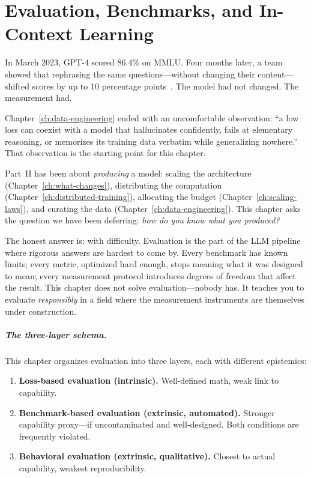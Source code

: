 \chapter{Evaluation, Benchmarks, and In-Context Learning}
\label{ch:evaluation}
\raggedbottom

In March 2023, GPT-4 scored 86.4\% on MMLU. Four months later, a team showed that rephrasing the same questions---without changing their content---shifted scores by up to 10 percentage points~\cite{sclar2023quantifying}. The model had not changed. The measurement had.

Chapter~\ref{ch:data-engineering} ended with an uncomfortable observation: ``a low loss can coexist with a model that hallucinates confidently, fails at elementary reasoning, or memorizes its training data verbatim while generalizing nowhere.'' That observation is the starting point for this chapter.

Part~II has been about \emph{producing} a model: scaling the architecture (Chapter~\ref{ch:what-changes}), distributing the computation (Chapter~\ref{ch:distributed-training}), allocating the budget (Chapter~\ref{ch:scaling-laws}), and curating the data (Chapter~\ref{ch:data-engineering}). This chapter asks the question we have been deferring: \emph{how do you know what you produced?}

The honest answer is: with difficulty. Evaluation is the part of the LLM pipeline where rigorous answers are hardest to come by. Every benchmark has known limits; every metric, optimized hard enough, stops meaning what it was designed to mean; every measurement protocol introduces degrees of freedom that affect the result. This chapter does not solve evaluation---nobody has. It teaches you to evaluate \emph{responsibly} in a field where the measurement instruments are themselves under construction.

\paragraph{The three-layer schema.} This chapter organizes evaluation into three layers, each with different epistemics:

\begin{enumerate}[nosep]
  \item \textbf{Loss-based evaluation (intrinsic).} Well-defined math, weak link to capability.
  \item \textbf{Benchmark-based evaluation (extrinsic, automated).} Stronger capability proxy---if uncontaminated and well-designed. Both conditions are frequently violated.
  \item \textbf{Behavioral evaluation (extrinsic, qualitative).} Closest to actual capability, weakest reproducibility.
\end{enumerate}

